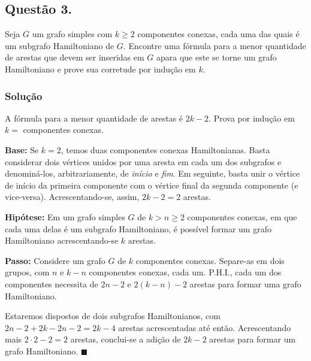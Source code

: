 \documentclass[12pt, letterpaper]{report}
\newcommand*{\CQD}{\hfill\ensuremath{\blacksquare}}%
\newcounter{ProblemNum}
\newcommand*{\anyproblem}[1]{\newpage\subsection*{#1}}
\newcommand*{\problem}[1]{\stepcounter{ProblemNum} %
   \anyproblem{Questão #1}}
\newcommand*{\soln}[1]{\subsubsection*{#1}}
\newcommand*{\solution}{\soln{Solução}}
\begin{document}
\problem{3.}
  Seja $ G $ um grafo simples com $ k \ge 2 $ componentes conexas, cada uma das quais é um subgrafo Hamiltoniano de  $ G $. Encontre uma fórmula para a menor quantidade de arestas que devem ser inseridas em $ G $ apara que este se torne um grafo Hamiltoniano e prove sua corretude por indução em $ k $.

\solution
  A fórmula para a menor quantidade de arestas é $2k - 2$. Prova por indução em $k =$ componentes conexas.

  \textbf{Base:} Se $k = 2$, temos duas componentes conexas Hamiltonianas. Basta considerar dois vértices unidos por uma aresta em cada um dos subgrafos e denominá-los, arbitrariamente, de \textit{início} e \textit{fim}. Em seguinte, basta unir o vértice de início da primeira componente com o vértice final da segunda componente (e vice-versa).
  Acrescentando-se, assim, $2k - 2 = 2$ arestas.

  \textbf{Hipótese:} Em um grafo simples $G$ de $k > n \geq 2$ componentes conexas, em que cada uma delas é um subgrafo Hamiltoniano, é possível formar um grafo Hamiltoniano acrescentando-se $k$ arestas.

  \textbf{Passo:} Considere um grafo $G$ de $k$ componentes conexas. Separe-as em dois grupos, com $n$ e $k - n$ componentes conexas, cada um. P.H.I., cada um dos componentes necessita de $2n - 2$ e $2(k - n) - 2$ arestas para formar uma grafo Hamiltoniano.
  
  Estaremos dispostos de dois subgrafos Hamiltonianos, com $2n - 2 + 2k - 2n - 2 = 2k - 4$ arestas acrescentadas até então. Acrescentando mais $2 \cdot 2 - 2 = 2$ arestas, conclui-se a adição de $2k - 2$ arestas para formar um grafo Hamiltoniano. \CQD
\end{document}
